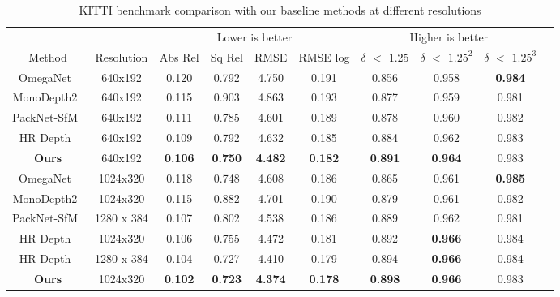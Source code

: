 \documentclass{bmvc2k}
\begin{document}
\begin{table}[!htbp]
\begin{center}
\begin{adjustbox}{max width=\textwidth}
\begin{tabular}{cccccccccc}
\hline
\toprule
& &\multicolumn{4}{c}{Lower is better} &\multicolumn{3}{c}{Higher is better} \\
\cmidrule(r){3-6}\cmidrule(l){7-9}
Method   & Resolution  &Abs Rel   &Sq Rel  &RMSE  &RMSE log  &$\delta$ $<$ 1.25  &  $\delta$ $<$ $1.25^{2}$  &$\delta$ $<$ $1.25^{3}$ \\
\bottomrule
\hline
 OmegaNet~\cite{tosi2020distilled}	& 640x192 &0.120	&0.792	&4.750	&0.191	&0.856	&0.958	&\textbf{0.984} \\
 MonoDepth2~\cite{godard2019digging} & 640x192   &0.115	&0.903	&4.863 	&0.193	&0.877	&0.959	&0.981  \\
 PackNet-SfM~\cite{guizilini20203d} &640x192  &0.111	&0.785	&4.601	&0.189	&0.878	&0.960	&0.982 \\
 HR Depth~\cite{lyu2020hr} & 640x192  &0.109	&0.792	&4.632	&0.185	&0.884	&0.962	&0.983 \\
 \textbf{Ours} & 640x192  &\textbf{0.106} 	&\textbf{0.750} 	&\textbf{4.482}	& \textbf{0.182}
 &\textbf{0.891}	&\textbf{0.964} 	&0.983  \\
 \midrule
 OmegaNet~\cite{tosi2020distilled}	 & 1024x320 &0.118	&0.748	&4.608	&0.186	&0.865	&0.961	&\textbf{0.985} \\
 MonoDepth2~\cite{godard2019digging}  & 1024x320 &0.115 &0.882 &4.701 &0.190 &0.879 &0.961 &0.982  \\
  PackNet-SfM~\cite{guizilini20203d} &1280 x 384  &0.107 &0.802 &4.538 &0.186 &0.889 &0.962 &0.981 \\
  HR Depth~\cite{lyu2020hr} & 1024x320   &0.106	&0.755	&4.472	&0.181	&0.892	&\textbf{0.966}	&0.984 \\
   HR Depth~\cite{lyu2020hr} &1280 x 384  &0.104 &0.727 &4.410 &0.179 &0.894 &\textbf{0.966} &0.984 \\

 \textbf{Ours} & 1024x320  &\textbf{0.102} &  \textbf{0.723} &  \textbf{4.374} &  \textbf{0.178} &  \textbf{0.898} &  \textbf{0.966} &  0.983 \\
\bottomrule
\hline
\end{tabular}
\end{adjustbox}
\end{center}
\caption{KITTI benchmark comparison with our baseline methods at different resolutions} \label{tab inp_res}
\end{table}
\end{document}
